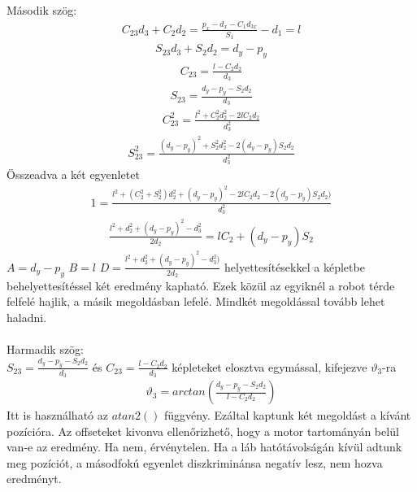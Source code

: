 \documentclass{article}
\begin{document}
Második szög:
\begin{align*}
C_{23} d_3+C_2 d_2=\frac{p_x-d_x-C_1 d_{3x}}{S_1} -d_1=l
\end{align*}
\begin{align*}
S_{23} d_3+S_2 d_2=d_y-p_y
\end{align*}
\begin{align*}
C_{23}=\frac{l-C_2 d_2}{d_3}
\end{align*}
\begin{align*}
S_{23}=\frac{d_y-p_y-S_2 d_2}{d_3} 
\end{align*}
\begin{align*}
C_{23}^2=\frac{l^2+C_2^2 d_2^2-2lC_2 d_2}{d_3^2}
\end{align*}
\begin{align*}
S_{23}^2=\frac{\left(d_y-p_y\right)^2+S_2^2d_2^2-2\left(d_y-p_y\right)S_2d_2}{d_3^2}
\end{align*}
Összeadva a két egyenletet
\begin{align*}
1=\frac{l^2+(C_2^2+S_2^2)d_2^2+\left(d_y-p_y\right)^2-2lC_2 d_2-2\left(d_y-p_y\right)S_2 d_2)}{d_3^2}
\end{align*}
\begin{align*}
\frac{l^2+d_2^2+\left(d_y-p_y\right)^2-d_3^2}{2d_2}=lC_2+\left(d_y-p_y\right)S_2
\end{align*}
$A=d_y-p_y$ $B=l$ $D=\frac{l^2+d_2^2+\left(d_y-p_y\right)^2-d_3^2)}{2d_2}$ helyettesítésekkel a képletbe behelyettesítéssel két eredmény kapható. Ezek közül az egyiknél a robot térde felfelé hajlik, a másik megoldásban lefelé. Mindkét megoldással tovább lehet haladni.\\\\

Harmadik szög:\\
$S_{23}=\frac{d_y-p_y-S_2 d_2}{d_3}$ és $C_{23}=\frac{l-C_2 d_2}{d_3}$ képleteket elosztva egymással, kifejezve $\vartheta_3$-ra
\begin{align*}
\vartheta_3=arctan\left(\frac{d_y-p_y-S_2 d_2}{l-C_2 d_2}\right)
\end{align*}
Itt is használható az $atan2()$ függvény. Ezáltal kaptunk két megoldást a kívánt pozícióra. Az offseteket kivonva ellenőrizhető, hogy a motor tartományán belül van-e az eredmény. Ha nem, érvénytelen. Ha a láb hatótávolságán kívül adtunk meg pozíciót, a másodfokú egyenlet diszkriminánsa negatív lesz, nem hozva eredményt.
\end{document}
